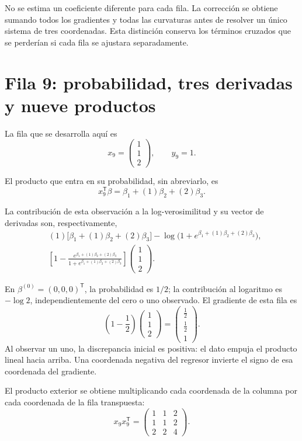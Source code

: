 \documentclass[11pt,a4paper]{article}
\newcommand{\T}{^{\mathsf T}}
\begin{document}
No se estima un coeficiente diferente para cada fila.
La corrección se obtiene sumando todos los gradientes y todas
las curvaturas antes de resolver un único sistema de tres coordenadas.
Esta distinción conserva los términos cruzados que se perderían
si cada fila se ajustara separadamente.

\clearpage
\section{Fila 9: probabilidad, tres derivadas y nueve productos}\label{logit91}
La fila que se desarrolla aquí es
\[
x_{9}=\begin{pmatrix}1\\1\\2\end{pmatrix},\qquad y_{9}=1.
\]

El producto que entra en su probabilidad, sin abreviarlo, es
\[
x_{9}\T\beta=\beta_1+(1)\beta_2+(2)\beta_3.
\]

La contribución de esta observación a la log-verosimilitud
y su vector de derivadas son, respectivamente,
\[
\begin{aligned}
&(1)\bigl[\beta_1+(1)\beta_2+(2)\beta_3\bigr]-\log\bigl(1+e^{\beta_1+(1)\beta_2+(2)\beta_3}\bigr),\\&\left[1-\frac{e^{\beta_1+(1)\beta_2+(2)\beta_3}}{1+e^{\beta_1+(1)\beta_2+(2)\beta_3}}\right]\begin{pmatrix}1\\1\\2\end{pmatrix}.\end{aligned}
\]

En \(\beta^{(0)}=(0,0,0)\T\), la probabilidad es \(1/2\);
la contribución al logaritmo es \(-\log2\), independientemente
del cero o uno observado. El gradiente de esta fila es
\[
\left(1-\frac12\right)\begin{pmatrix}1\\1\\2\end{pmatrix}=\begin{pmatrix}\frac{1}{2}\\\frac{1}{2}\\1\end{pmatrix}.
\]
Al observar un uno, la discrepancia inicial es positiva: el dato empuja el producto lineal hacia arriba. Una coordenada negativa del regresor invierte el signo de esa coordenada del gradiente.

El producto exterior se obtiene multiplicando cada coordenada
de la columna por cada coordenada de la fila transpuesta:
\[
x_{9}x_{9}\T=\begin{pmatrix}1&1&2\\1&1&2\\2&2&4\end{pmatrix}.
\]
\end{document}
